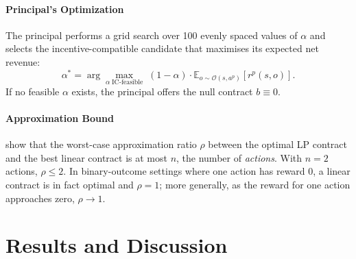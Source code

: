 \documentclass{article}
\theoremstyle{plain}
\theoremstyle{definition}
\theoremstyle{remark}
\begin{document}
\paragraph{Principal’s Optimization}
The principal performs a grid search over 100 evenly spaced values of $\alpha$ and selects the incentive-compatible candidate that maximises its expected net revenue:
\[
  \alpha^* = \arg\max_{\alpha \;\text{IC-feasible}} \;(1 - \alpha) \cdot \mathbb{E}_{o \sim \mathcal{O}(s,a^p)}[r^p(s,o)].
\]
If no feasible $\alpha$ exists, the principal offers the null contract $b \equiv 0$.

\paragraph{Approximation Bound}
\citet{dutting2024survey} show that the worst-case approximation ratio $\rho$ between the optimal LP contract and the best linear contract is at most $n$, the number of \emph{actions}. With $n = 2$ actions, $\rho \leq 2$. In binary-outcome settings where one action has reward 0, a linear contract is in fact optimal and $\rho = 1$; more generally, as the reward for one action approaches zero, $\rho \to 1$.

\section{Results and Discussion}
\end{document}

